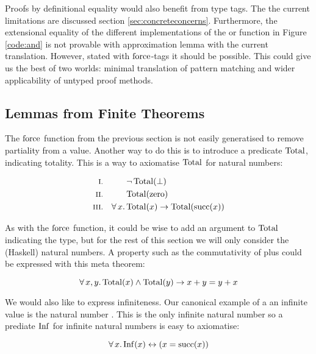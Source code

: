 Proofs by definitional equality would also benefit from type tags. The
the current limitations are discussed section
\ref{sec:concreteconcerns}. Furthermore, the extensional equality of
the different implementations of the or function in Figure
\ref{code:and} is not provable with approximation lemma with the
current translation. However, stated with $\mathrm{force}$-tags it should
be possible. This could give us the best of two worlds: minimal
translation of pattern matching and wider applicability of untyped
proof methods.

\subsection{Lemmas from Finite Theorems}
\label{sec:total}

\newcommand\Inf{\fn{Inf}}
\newcommand\Total{\fn{Total}}
\newcommand\Fin{\fn{Fin}}
The $\mathrm{force}$ function from the previous section is not easily
generatised to remove partiality from a value. Another way to do this
is to introduce a predicate $\Total$, indicating totality. This is a
way to axiomatise $\Total$ for natural numbers:

\begin{align*}
\rom{1} &&        & \neg \, \Total(\bot) \\
\rom{2} &&        & \Total(\fn{zero}) \\
\rom{3} && \fa{x} & \Total(x) \rightarrow \Total(\fn{succ}(x))
\end{align*}

As with the $\mathrm{force}$ function, it could be wise to add an argument
to $\Total$ indicating the type, but for the rest of this section we
will only consider the (Haskell) natural numbers. A property such as the
commutativity of plus could be expressed with this meta theorem:

\begin{equation*}
\faa{x}{y} \Total(x) \wedge \Total(y) \rightarrow x + y = y + x
\end{equation*}

We would also like to express infiniteness. Our canonical example of a
an infinite value is the natural number . This is
the only infinite natural number so a prediate $\Inf$ for infinite
natural numbers is easy to axiomatise:

\begin{equation*}
\fa{x} \Inf(x) \leftrightarrow (x = \fn{succ}(x))
\end{equation*}

